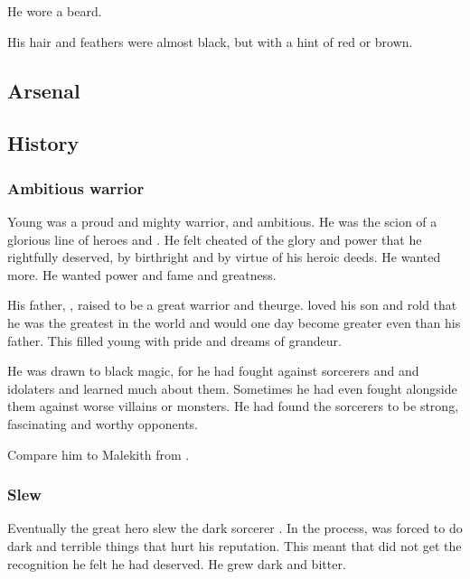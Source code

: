 He wore a beard. 

His hair and feathers were almost black, but with a hint of red or brown. 









\subsection{Arsenal}









\subsection{History}





\subsubsection{Ambitious warrior}
Young \Netzach was a proud and mighty warrior, and ambitious. 
He was the scion of a glorious line of heroes and . 
He felt cheated of the glory and power that he rightfully deserved, by birthright and by virtue of his heroic deeds. 
He wanted more.
He wanted power and fame and greatness. 

His father, , raised \Netzach to be a great warrior and theurge. 
\Sharrath loved his son and rold \Netzach that he was the greatest \resphan in the world and would one day become greater even than his father. 
This filled young \Netzach with pride and dreams of grandeur.

He was drawn to black magic, for he had fought against sorcerers and  and idolaters and learned much about them.
Sometimes he had even fought alongside them against worse villains or monsters.
He had found the sorcerers to be strong, fascinating and worthy opponents. 

Compare him to Malekith from \cite{GavThorpe:Malekith}. 





\subsubsection{Slew \Sartheron}
Eventually the great hero \Netzach slew the dark sorcerer . 
In the process, \Netzach was forced to do dark and terrible things that hurt his reputation. 
This meant that \Netzach did not get the recognition he felt he had deserved.
He grew dark and bitter. 





